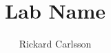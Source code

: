 \documentclass{LabRapport}
\author{Rickard Carlsson}
\title{Lab Name}
\begin{document}
\EltigreTitle
\tableofcontents
\newpage






\end{document}
